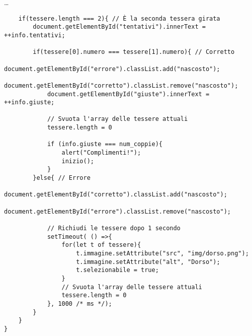 \begin{frame}[fragile]\transfade
  \begin{sol}\centering\dots
\begin{verbatim}
    if(tessere.length === 2){ // È la seconda tessera girata
        document.getElementById("tentativi").innerText = ++info.tentativi;

        if(tessere[0].numero === tessere[1].numero){ // Corretto
            document.getElementById("errore").classList.add("nascosto");
            document.getElementById("corretto").classList.remove("nascosto");
            document.getElementById("giuste").innerText = ++info.giuste;

            // Svuota l'array delle tessere attuali
            tessere.length = 0

            if (info.giuste === num_coppie){
                alert("Complimenti!");
                inizio();
            }
        }else{ // Errore
            document.getElementById("corretto").classList.add("nascosto");
            document.getElementById("errore").classList.remove("nascosto");

            // Richiudi le tessere dopo 1 secondo
            setTimeout( () =>{
                for(let t of tessere){
                    t.immagine.setAttribute("src", "img/dorso.png");
                    t.immagine.setAttribute("alt", "Dorso");
                    t.selezionabile = true;
                }
                // Svuota l'array delle tessere attuali
                tessere.length = 0
            }, 1000 /* ms */);
        }
    }
}
      \end{verbatim}
  \end{sol}
\end{frame}